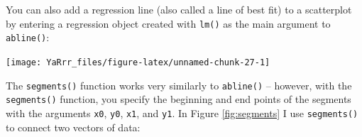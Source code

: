 \documentclass[]{book}
\newenvironment{Shaded}{\begin{snugshade}}{\end{snugshade}}
\newcommand{\KeywordTok}[1]{\textcolor[rgb]{0.13,0.29,0.53}{\textbf{{#1}}}}
\newcommand{\DataTypeTok}[1]{\textcolor[rgb]{0.13,0.29,0.53}{{#1}}}
\newcommand{\DecValTok}[1]{\textcolor[rgb]{0.00,0.00,0.81}{{#1}}}
\newcommand{\StringTok}[1]{\textcolor[rgb]{0.31,0.60,0.02}{{#1}}}
\newcommand{\CommentTok}[1]{\textcolor[rgb]{0.56,0.35,0.01}{\textit{{#1}}}}
\newcommand{\NormalTok}[1]{{#1}}
\theoremstyle{definition}
\theoremstyle{definition}
\theoremstyle{remark}
\begin{document}
You can also add a regression line (also called a line of best fit) to a
scatterplot by entering a regression object created with \texttt{lm()}
as the main argument to \texttt{abline()}:

\begin{Shaded}
\end{Shaded}

\begin{center}\texttt{[image: YaRrr\_files/figure-latex/unnamed-chunk-27-1]} \end{center}

The \texttt{segments()} function works very similarly to
\texttt{abline()} -- however, with the \texttt{segments()} function, you
specify the beginning and end points of the segments with the arguments
\texttt{x0}, \texttt{y0}, \texttt{x1}, and \texttt{y1}. In Figure
\ref{fig:segments} I use \texttt{segments()} to connect two vectors of
data:
\end{document}
